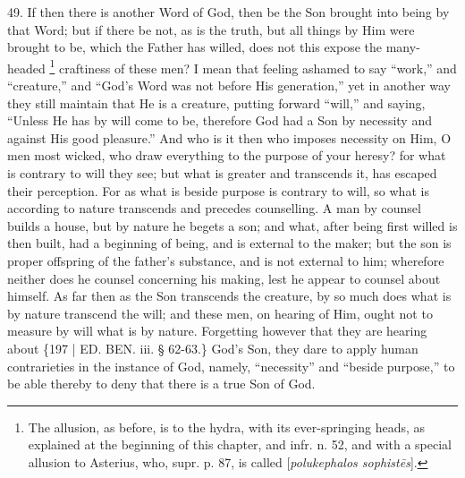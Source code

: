 49. If then there is another
Word of God, then be the Son brought into being by that Word; but if
there be not, as is the truth, but all things by Him were brought to
be, which the Father has willed, does not this expose the many-headed
\footnote{The allusion, as before, is to the hydra, with its ever-springing
heads, as explained at the beginning of this chapter, and infr. n. 52,
and with a special allusion to Asterius, who, supr. p. 87, is called [\emph{polukephalos
sophist\={e}s}].} craftiness of these men?
I mean that feeling ashamed to say ``work,'' and ``creature,'' and ``God's
Word was not before His generation,'' yet in another way they still
maintain that He is a creature, putting forward ``will,'' and saying, ``Unless
He has by will come to be, therefore God had a Son by necessity and
against His good pleasure.'' And who is it then who imposes necessity
on Him, O men most wicked, who draw everything to the purpose of your
heresy? for what is contrary to will they see; but what is greater and
transcends it, has escaped their perception. For as what is beside
purpose is contrary to will, so what is according to nature transcends
and precedes counselling. A man by counsel builds a house, but by
nature he begets a son; and what, after being first willed is then
built, had a beginning of being, and is external to the maker; but the
son is proper offspring of the father's substance, and is not external
to him; wherefore neither does he counsel concerning his making, lest
he appear to counsel about himself. As far then as the Son transcends
the creature, by so much does what is by nature transcend the will;
and these men, on hearing of Him, ought not to measure by will what is
by nature. Forgetting however that they are hearing about \{197 | ED. BEN. iii. § 62-63.\}
God's Son, they dare to apply human contrarieties in the instance of
God, namely, ``necessity'' and ``beside purpose,'' to be able thereby to
deny that there is a true Son of God.

